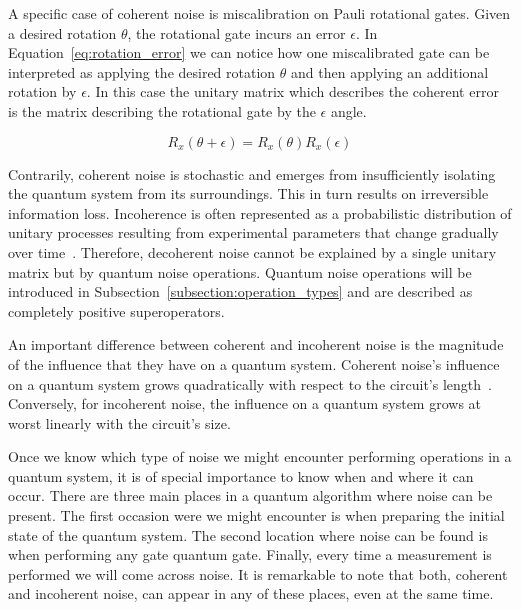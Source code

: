 A specific case of coherent noise is miscalibration on Pauli rotational
gates. Given a desired rotation \(\theta\), the rotational gate incurs
an error \(\epsilon\). In Equation~\ref{eq:rotation_error} we can notice
how one miscalibrated gate can be interpreted as applying the desired
rotation \(\theta\) and then applying an additional rotation by
\(\epsilon\). In this case the unitary matrix which describes the
coherent error is the matrix describing the rotational gate by the
\(\epsilon\) angle. \

\begin{equation}\label{eq:rotation_error}
  R_x\left(\theta + \epsilon\right) = R_x\left(\theta\right)R_x\left(\epsilon\right)
\end{equation}

Contrarily, coherent noise is stochastic and emerges from insufficiently
isolating the quantum system from its surroundings. This in turn results
on irreversible information loss. Incoherence is often represented as a
probabilistic distribution of unitary processes resulting from experimental
parameters that change gradually over time~\cite{boulant_incoherent_2004}.
Therefore, decoherent noise cannot be explained by a single unitary matrix
but by quantum noise operations. Quantum noise operations will be introduced
in Subsection~\ref{subsection:operation_types} and are described as
completely positive superoperators. \

An important difference between coherent and incoherent noise is the
magnitude of the influence that they have on a quantum system.
Coherent noise's influence on a quantum system grows quadratically
with respect to the circuit's length~\cite{iverson_coherence_2020}. Conversely, for
incoherent noise, the influence on a quantum system grows at worst
linearly with the circuit's size. \

Once we know which type of noise we might encounter performing operations
in a quantum system, it is of special importance to know when and where
it can occur. There are three main places in a quantum algorithm where
noise can be present. The first occasion were we might encounter is when
preparing the initial state of the quantum system. The second location
where noise can be found is when performing any gate quantum gate.
Finally, every time a measurement is performed we will come across noise.
It is remarkable to note that both, coherent and incoherent noise, can
appear in any of these places, even at the same time. \


